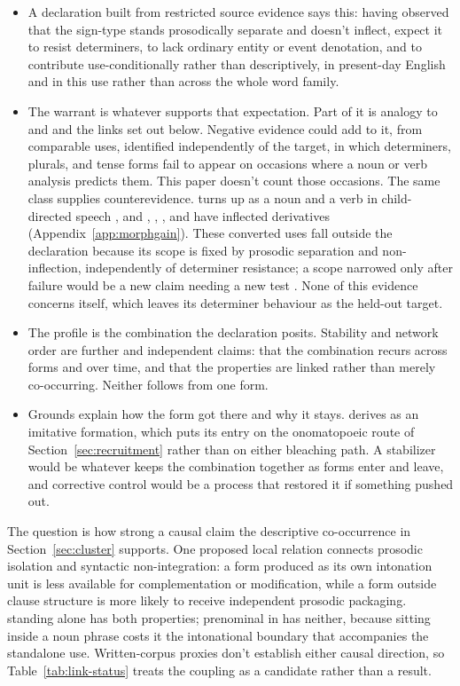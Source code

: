 \documentclass[12pt]{article}
\begin{document}
\begin{itemize}
\item A declaration built from restricted source evidence says this: having
  observed that the sign-type stands prosodically separate and doesn't
  inflect, expect it to resist determiners, to lack ordinary entity or event
  denotation, and to contribute use-conditionally rather than descriptively,
  in present-day English and in this use rather than across the whole word
  family.
\item The warrant is whatever supports that expectation. Part of it is
  analogy to  and  and the links set out below.
  Negative evidence could add to it, from comparable uses, identified
  independently of the target, in which determiners, plurals, and tense forms
  fail to appear on occasions where a noun or verb analysis predicts them.
  This paper doesn't count those occasions. The same class supplies
  counterevidence.  turns up as a noun and a verb in
  child-directed speech \citep[36]{stange2016}, and ,
  , , and  have inflected derivatives
  (Appendix~\ref{app:morphgain}). These converted uses fall outside the
  declaration because its scope is fixed by prosodic separation and
  non-inflection, independently of determiner resistance; a scope narrowed
  only after failure would be a new claim needing a new
  test \citep[16]{reynolds2026projectibilityHistory}. None of this evidence
  concerns  itself, which leaves its determiner behaviour as the
  held-out target.
\item The profile is the combination the declaration posits. Stability and
  network order are further and independent claims: that the combination
  recurs across forms and over time, and that the properties are linked
  rather than merely co-occurring. Neither follows from one form.
\item Grounds explain how the form got there and why it stays.
  \textcite{oed_oof} derives  as an imitative formation, which
  puts its entry on the onomatopoeic route of Section~\ref{sec:recruitment}
  rather than on either bleaching path. A stabilizer would be whatever keeps the
  combination together as forms enter and leave, and corrective control would be
  a process that restored it if something pushed  out.
\end{itemize}

The question is how strong a causal claim the descriptive co-occurrence in
Section~\ref{sec:cluster} supports. One proposed local relation connects
prosodic isolation and syntactic non-integration: a form
produced as its own intonation unit is less available for complementation
or modification, while a form outside clause structure is more likely to
receive independent prosodic packaging.  standing alone has
both properties; prenominal  in  has
neither, because sitting inside a noun phrase costs it the intonational
boundary that accompanies the standalone use. Written-corpus proxies don't
establish either causal direction, so Table~\ref{tab:link-status} treats the
coupling as a candidate rather than a result.
\end{document}
